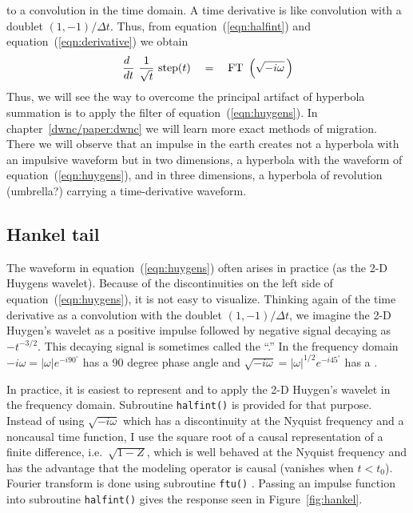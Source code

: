 to a convolution in the time domain.
A time derivative is like convolution with a doublet $(1,-1)/\Delta t$.
Thus, from
equation~(\ref{eqn:halfint}) and 
equation~(\ref{eqn:derivative})
we obtain
\begin{equation}
\label{eqn:huygens}
{d \ \over dt} \ {1\over \sqrt{t}} \ {\rm step}(t) \quad =\quad
{\rm FT}\ \left(  \sqrt{-i\omega} \,\right) 
\end{equation}
Thus, we will see the way to overcome
the principal artifact of hyperbola summation
is to apply the filter of equation~(\ref{eqn:huygens}).
In chapter~\ref{dwnc/paper:dwnc}
we will learn more exact methods of migration.
There we will observe that an impulse in the earth
creates not a hyperbola with an impulsive waveform
but in two dimensions,
a hyperbola with the waveform of
equation~(\ref{eqn:huygens}),
and in three dimensions,
a hyperbola of revolution (umbrella?)
carrying a time-derivative waveform.

\subsection{Hankel tail}
\par
The waveform in equation~(\ref{eqn:huygens}) often arises in practice
(as the 2-D Huygens wavelet).
Because of the discontinuities on the left side of equation~(\ref{eqn:huygens}),
it is not easy to visualize.
Thinking again of the time derivative
as a convolution with the doublet $(1,-1)/\Delta t$,
we imagine the 2-D Huygen's wavelet as a positive impulse followed
by negative signal decaying as $-t^{-3/2}$.
This decaying signal is sometimes called the ``.''
In the frequency domain
$-i\omega= |\omega |e ^ {-i90^\circ}$
has a 90 degree phase angle and 
$\sqrt{-i\omega}= |\omega |^{1/2} e ^ {-i45^\circ}$
has a .


\par
In practice, it is easiest to represent
and to apply the 2-D Huygen's wavelet in the frequency domain.
Subroutine \texttt{halfint()}  is provided for that purpose.
Instead of using $\sqrt{-i\omega}$ which
has a discontinuity at the Nyquist frequency
and a noncausal time function,
I use the square root of a causal representation
of a finite difference, i.e.~$\sqrt{1-Z}$,
which is well behaved at the Nyquist frequency
and has the advantage that the modeling operator is causal
(vanishes when $t<t_0$).
Fourier transform is done using subroutine \texttt{ftu()} .
Passing an impulse function into subroutine {\tt halfint()}
gives the response seen in Figure~\ref{fig:hankel}.

